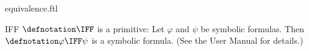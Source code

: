 \documentclass{stex}
\begin{document}
\begin{smodule}{equivalence.ftl}


\begin{documentation}{IFF}
  $\defnotation\IFF$ is a \Naproche primitive:
  Let $\varphi$ and $\psi$ be symbolic formulas.
  Then $\defnotation\varphi\IFF\psi$ is a symbolic formula.
  (See the \Naproche User Manual for details.)
\end{documentation}

\end{smodule}
\end{document}
